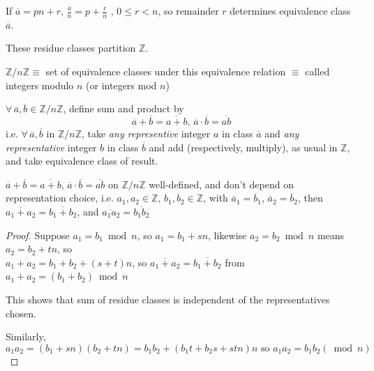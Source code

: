 If $\overline{a} = pn +r$, $\frac{ \overline{a}}{n} = p + \frac{r}{n}$ , $0\leq r < n$, so remainder $r$ determines equivalence class $\overline{a}$.

These residue classes partition $\mathbb{Z}$. 
\begin{definition}
$\mathbb{Z} / n\mathbb{Z} \equiv$ set of equivalence classes under this equivalence relation $\equiv$ called integers modulo $n$ (or integers mod $n$)
\end{definition} 

\begin{definition}
	$\forall \, \overline{a}, \overline{b} \in \mathbb{Z} / n \mathbb{Z}$, define sum and product by 
	\begin{equation}
	\overline{a} + \overline{b} = \overline{a+b}, \, \overline{a} \cdot \overline{b} = \overline{ab}
	\end{equation}
	i.e. $\forall \, \overline{a}, \overline{b}$ in $\mathbb{Z}/n\mathbb{Z}$, take \emph{any representive} integer $a$ in class $\overline{a}$ and \emph{any representative} integer $b$ in class $\overline{b}$ and add (respectively, multiply), as usual in $\mathbb{Z}$, and take equivalence class of result.
\end{definition}

\begin{theorem}
	$\overline{a} + \overline{b} = \overline{a+b}$, $\overline{a} \cdot \overline{b} = \overline{ab}$ on $\mathbb{Z}/n\mathbb{Z}$ well-defined, and don't depend on representation choice, i.e. $a_1, a_2 \in \mathbb{Z}$, $b_1, b_2 \in \mathbb{Z}$, with $\overline{a}_1 = \overline{b}_1$, $\overline{a}_2 = \overline{b}_2$, then $\overline{a_1 + a_2} = \overline{b_1 + b_2}$, and $\overline{a_1 a_2} = \overline{b_1 b_2}$
\end{theorem} 

\begin{proof}
	Suppose $a_1 = b_1 \bmod{n}$, so $a_1 = b_1 + sn$, likewise $a_2 = b_2 \bmod{n}$ means $a_2 = b_2 + tn$, so \\
	$a_1 + a_2 = b_1 + b_2 + (s+t)n$, so $\overline{a_1 + a_2} = \overline{b_1 + b_2}$ from $a_1 + a_2 = (b_1 + b_2) \bmod{n}$

This shows that sum of residue classes is independent of the representatives chosen.

Similarly, 
\[
a_1 a_2 = (b_1 + sn) (b_2 + tn) = b_1 b_2 + (b_1 t + b_2 s + stn) n \text{ so } a_1 a_2 = b_1b_2(\bmod{n})
\]

\end{proof}

